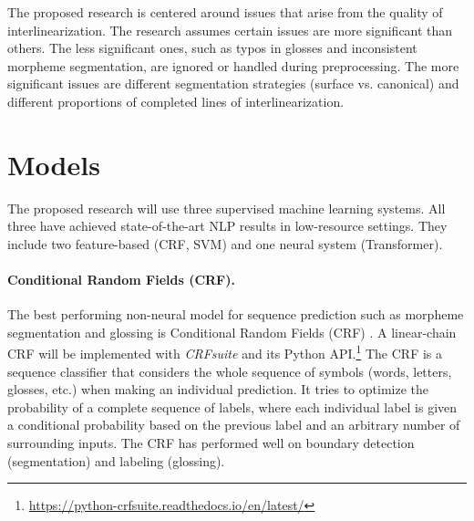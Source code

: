 The proposed research is centered around issues that arise from the quality of interlinearization. 
The research assumes certain issues are more significant than others. The less significant ones, such as typos in glosses and inconsistent morpheme segmentation, are ignored or handled during preprocessing. The more significant issues are different segmentation strategies (surface vs. canonical) and different proportions of completed lines of interlinearization.


\section{Models}
\label{sec:models}

The proposed research will use three supervised machine learning systems. All three have achieved state-of-the-art NLP results in low-resource settings. They include two feature-based (CRF, SVM) and one neural system (Transformer). 

\paragraph{Conditional Random Fields (CRF).} The best performing non-neural model for sequence prediction such as morpheme segmentation and glossing is Conditional Random Fields (CRF) \citep{lafferty_conditional_2001,muller_efficient_2013,ruokolainen_comparative_2016}. A linear-chain CRF \citep{lafferty_conditional_2001} will be implemented with \textit{CRFsuite} \citep{okazaki2007} and its Python API.\footnote{\url{https://python-crfsuite.readthedocs.io/en/latest/}} 
The CRF is a sequence classifier that considers the whole sequence of symbols (words, letters, glosses, etc.) when making an individual prediction. It tries to optimize the probability of a complete sequence of labels, where each individual label is given a conditional probability based on the previous label and an arbitrary number of surrounding inputs. %
The CRF has performed well on boundary detection (segmentation) and labeling (glossing). 

